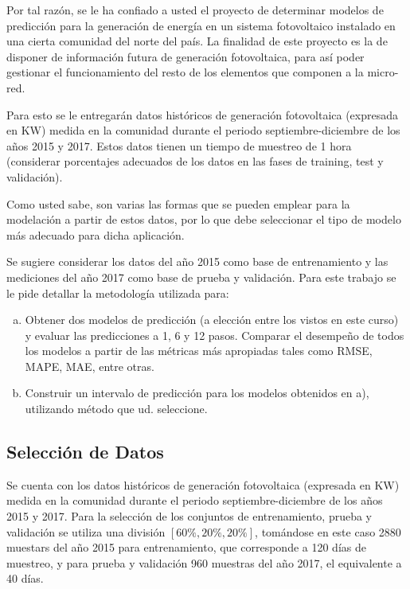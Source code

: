 \documentclass[12pt]{article}
\begin{document}
Por tal razón, se le ha confiado a usted el proyecto de determinar modelos de predicción para la generación de energía en un sistema fotovoltaico instalado en una cierta comunidad del norte del país. La finalidad de este proyecto es la de disponer de información futura de generación fotovoltaica, para así poder gestionar el funcionamiento del resto de los elementos que componen a la micro-red.

Para esto se le entregarán datos históricos de generación fotovoltaica (expresada en KW) medida en la comunidad durante el periodo septiembre-diciembre de los años 2015 y 2017. Estos datos tienen un tiempo de muestreo de 1 hora (considerar porcentajes adecuados de los datos en las fases de training, test y validación).

Como usted sabe, son varias las formas que se pueden emplear para la modelación a partir de estos datos, por lo que debe seleccionar el tipo de modelo más adecuado para dicha aplicación.

Se sugiere considerar los datos del año 2015 como base de entrenamiento y las mediciones del año 2017 como base de prueba y validación. Para este trabajo se le pide detallar la metodología utilizada para:

\begin{enumerate}[a)]
  \item Obtener dos modelos de predicción (a elección entre los vistos en este curso) y evaluar las predicciones a 1, 6 y 12 pasos. Comparar el desempeño de todos los modelos a partir de las métricas más apropiadas tales como RMSE, MAPE, MAE, entre otras.
  \item Construir un intervalo de predicción para los modelos obtenidos en a), utilizando método que ud. seleccione.
\end{enumerate}

\subsection{Selección de Datos}
Se cuenta con los datos históricos de generación fotovoltaica (expresada en KW) medida en la comunidad durante el periodo septiembre-diciembre de los años 2015 y 2017. Para la selección de los conjuntos de entrenamiento, prueba y validación se utiliza una división $[60\%,20\%,20\%]$, tomándose en este caso 2880 muestars del año 2015 para entrenamiento, que corresponde a 120 días de muestreo, y para prueba y validación 960 muestras del año 2017, el equivalente a 40 días.
				



\newpage


\end{document}
